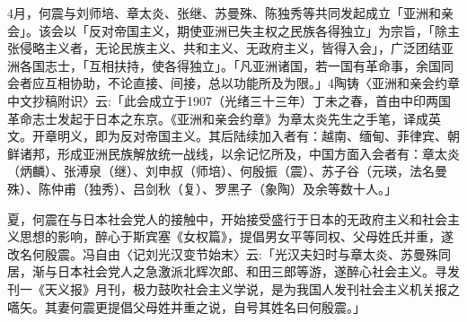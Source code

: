4月，何震与刘师培、章太炎、张继、苏曼殊、陈独秀等共同发起成立「亚洲和亲会」。该会以「反对帝国主义，期使亚洲已失主权之民族各得独立」为宗旨，「除主张侵略主义者，无论民族主义、共和主义、无政府主义，皆得入会」，广泛团结亚洲各国志士，「互相扶持，使各得独立」。「凡亚洲诸国，若一国有革命事，余国同会者应互相协助，不论直接、间接，总以功能所及为限。」4陶铸〈亚洲和亲会约章中文抄稿附识〉云:「此会成立于1907（光绪三十三年）丁未之春，首由中印两国革命志士发起于日本之东京。《亚洲和亲会约章》为章太炎先生之手笔，译成英文。开章明义，即为反对帝国主义。其后陆续加入者有：越南、缅甸、菲律宾、朝鲜诸邦，形成亚洲民族解放统一战线，以余记忆所及，中国方面入会者有：章太炎（炳麟）、张溥泉（继）、刘申叔（师培）、何殷振（震）、苏子谷（元瑛，法名曼殊）、陈仲甫（独秀）、吕剑秋（复）、罗黑子（象陶）及余等数十人。」

夏，何震在与日本社会党人的接触中，开始接受盛行于日本的无政府主义和社会主义思想的影响，醉心于斯宾塞《女权篇》，提倡男女平等同权、父母姓氏并重，遂改名何殷震。冯自由〈记刘光汉变节始末〉云:「光汉夫妇时与章太炎、苏曼殊同居，渐与日本社会党人之急激派北辉次郎、和田三郎等游，遂醉心社会主义。寻发刊一《天义报》月刊，极力鼓吹社会主义学说，是为我国人发刊社会主义机关报之嚆矢。其妻何震更提倡父母姓并重之说，自号其姓名曰何殷震。」

\vfill
\begin{BookNotes}
\end{BookNotes}

